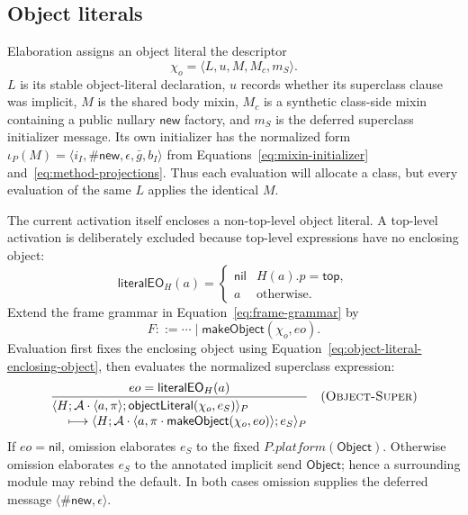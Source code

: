 \documentclass[11pt]{article}
\numberwithin{equation}{section}
\newcommand{\kw}[1]{\ensuremath{\mathsf{#1}}}
\newcommand{\nil}{\kw{nil}}
\newcommand{\rulelabel}[1]{\textsc{#1}}
\begin{document}
\subsection{Object literals}
\label{sec:object-literals}

Elaboration assigns an object literal the descriptor
\begin{equation}\label{eq:object-literal-descriptor}
 \chi_o=\langle L,u,M,M_c,m_S\rangle.
\end{equation}
$L$ is its stable object-literal declaration, $u$ records whether its
superclass clause was implicit, $M$ is the shared body mixin, $M_c$ is a
synthetic class-side mixin containing a public nullary \kw{new} factory, and
$m_S$ is the deferred superclass initializer message.  Its own initializer
has the normalized form
$\iota_P(M)=\langle i_I,\#\kw{new},\epsilon,\bar g,b_I\rangle$ from
Equations~\eqref{eq:mixin-initializer} and~\eqref{eq:method-projections}.
Thus each evaluation will allocate a class,
but every evaluation of the same $L$ applies the identical $M$.

The current activation itself encloses a non-top-level object literal.  A
top-level activation is deliberately excluded because top-level expressions
have no enclosing object:
\begin{equation}\label{eq:object-literal-enclosing-object}
 \mathsf{literalEO}_H(a)=
 \begin{cases}
   \nil & H(a).p=\kw{top},\\
   a & \text{otherwise.}
 \end{cases}
\end{equation}
Extend the frame grammar in Equation~\eqref{eq:frame-grammar} by
\begin{equation}\label{eq:object-literal-frame}
 F::=\cdots\mid\kw{makeObject}(\chi_o,eo).
\end{equation}
Evaluation first fixes the enclosing object using
Equation~\eqref{eq:object-literal-enclosing-object}, then evaluates the
normalized superclass expression:
\[
\dfrac{eo=\mathsf{literalEO}_H(a)}
 {\begin{aligned}
  &\langle H;\mathcal A\cdot\langle a,\pi\rangle;
       \kw{objectLiteral}(\chi_o,e_S)\rangle_P\\[-1mm]
  &\quad\longmapsto
   \langle H;\mathcal A\cdot\langle a,
       \pi\cdot\kw{makeObject}(\chi_o,eo)\rangle;e_S\rangle_P
 \end{aligned}}
\quad(\rulelabel{Object-Super})
\]
If $eo=\nil$, omission elaborates $e_S$ to the fixed
$P.\mathit{platform}(\kw{Object})$.  Otherwise omission elaborates $e_S$ to
the annotated implicit send \kw{Object}; hence a surrounding module may
rebind the default.  In both cases omission supplies the deferred message
$\langle\#\kw{new},\epsilon\rangle$.
\end{document}
